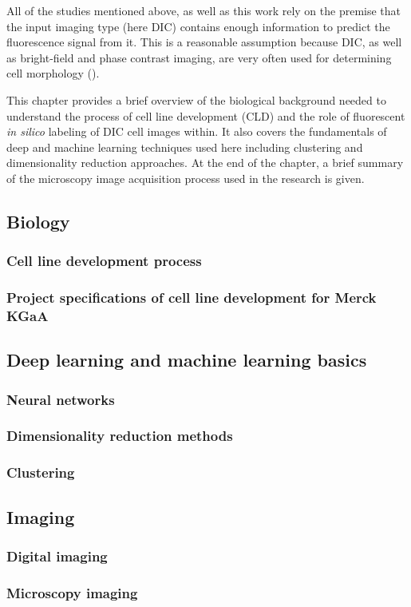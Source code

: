     All of the studies mentioned above, as well as this work rely on the premise that the input imaging type (here DIC) contains enough information to predict the fluorescence signal from it. This is a reasonable assumption because DIC, as well as bright-field and phase contrast imaging, are very often used for determining cell morphology (\cite{Kasprowicz_2017}).

    This chapter provides a brief overview of the biological background needed to understand the process of cell line development (CLD) and the role of fluorescent \textit{in silico} labeling of DIC cell images within. It also covers the fundamentals of deep and machine learning techniques used here including clustering and dimensionality reduction approaches. At the end of the chapter, a brief summary of the microscopy image acquisition process used in the research is given.

    \subsection{Biology}
        \subsubsection{Cell line development process}
        
        \subsubsection{Project specifications of cell line development for Merck KGaA}
        
    \subsection{Deep learning and machine learning basics}\label{subsection:dl}
        \subsubsection{Neural networks}
            
        \subsubsection{Dimensionality reduction methods}
            
        \subsubsection{Clustering}
            
    \subsection{Imaging}
        \subsubsection{Digital imaging}
            
        \subsubsection{Microscopy imaging}
            